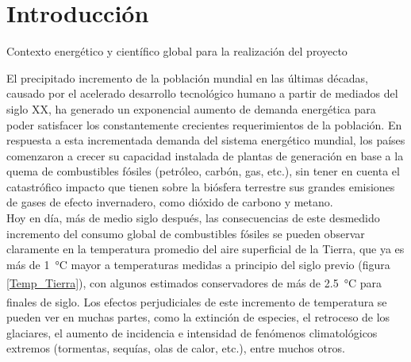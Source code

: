 \section{Introducción}
\thispagestyle{plain}

\vspace{0.5cm}

\Large\scshape
\begin{center}
    {\Medium Contexto energético y científico global para la realización del proyecto}
\end{center}
\normalfont

\divider

El precipitado incremento de la población mundial en las últimas décadas, causado por el acelerado desarrollo tecnológico humano a partir de mediados del siglo XX, ha generado un exponencial aumento de demanda energética para poder satisfacer los constantemente crecientes requerimientos de la población. En respuesta a esta incrementada demanda del sistema energético mundial, los países comenzaron a crecer su capacidad instalada de plantas de generación en base a la quema de combustibles fósiles (petróleo, carbón, gas, etc.), sin tener en cuenta el catastrófico impacto que tienen sobre la biósfera terrestre sus grandes emisiones de gases de efecto invernadero, como dióxido de carbono y metano.\\

Hoy en día, más de medio siglo después, las consecuencias de este desmedido incremento del consumo global de combustibles fósiles se pueden observar claramente en la temperatura promedio del aire superficial de la Tierra, que ya es más de \SI{1}{\celsius} mayor a temperaturas medidas a principio del siglo previo (figura \ref{Temp_Tierra})\textsuperscript{\cite{TempGlobal}}, con algunos estimados conservadores de más de \SI{2.5}{\celsius} para finales de siglo.\textsuperscript{\cite{EstimadoTemp}} Los efectos perjudiciales de este incremento de temperatura se pueden ver en muchas partes, como la extinción de especies, el retroceso de los glaciares, el aumento de incidencia e intensidad de fenómenos climatológicos extremos (tormentas, sequías, olas de calor, etc.), entre muchos otros.\\

